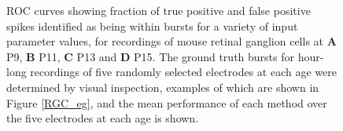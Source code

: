\documentclass[12pt, titlepage]{article}
\begin{document}
		\begin{figure}[h]
			\centering
			\caption{ROC curves showing fraction of true positive and false positive spikes identified as being within bursts for a variety of input parameter values, for recordings of mouse retinal ganglion cells at \textbf{A} P9, \textbf{B} P11,  \textbf{C} P13 and \textbf{D} P15. The ground truth bursts for hour-long recordings of five randomly selected electrodes at each age were determined by visual inspection, examples of which are shown in Figure \ref{RGC_eg}, and the mean performance of each method over the five electrodes at each age is shown.}
			\label{ROC}
		\end{figure}  
\end{document}
